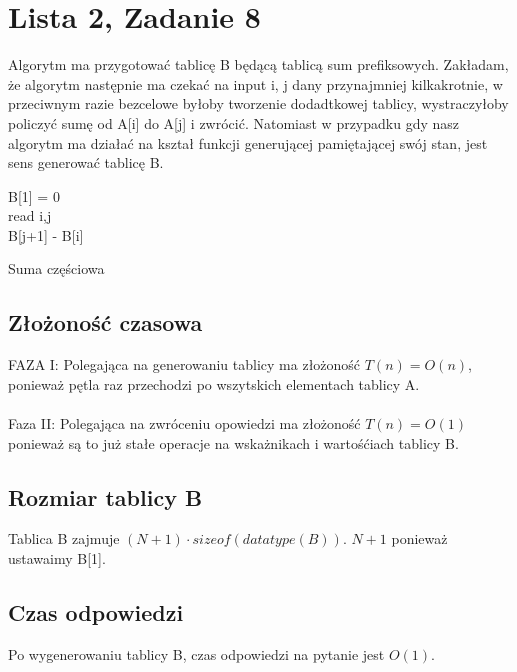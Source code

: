 \documentclass{article}
\begin{document}
\section{Lista 2, Zadanie 8}
Algorytm ma przygotować tablicę B będącą tablicą sum prefiksowych. Zakładam, że algorytm następnie ma czekać na input i, j dany przynajmniej kilkakrotnie, w przeciwnym razie bezcelowe byłoby tworzenie dodadtkowej tablicy, wystraczyłoby policzyć sumę od A[i] do A[j] i zwrócić. Natomiast w przypadku gdy nasz algorytm ma działać na kształ funkcji generującej pamiętającej swój stan, jest sens generować tablicę B. 

\begin{algorithm}[H]
 \medskip
 B[1] = 0\\
  \medskip
  read i,j\\
 \Return B[j+1] - B[i]
 \caption{Suma częściowa}
\end{algorithm}

\subsection{Złożoność czasowa}
FAZA I: Polegająca na generowaniu tablicy ma złożoność $T(n) = O(n)$, ponieważ pętla raz przechodzi po wszytskich elementach tablicy A.\\\\
Faza II: Polegająca na zwróceniu opowiedzi ma złożoność $T(n) = O(1)$ ponieważ są to już stałe operacje na wskażnikach i wartośćiach tablicy B.

\subsection{Rozmiar tablicy B}
Tablica B zajmuje $(N+1) \cdot sizeof(datatype(B))$. $N+1$ ponieważ ustawaimy B[1].

\subsection{Czas odpowiedzi}
Po wygenerowaniu tablicy B, czas odpowiedzi na pytanie jest $O(1)$.
\end{document}
